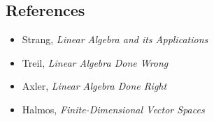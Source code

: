 \subsection*{References}
\begin{itemize}
    \item Strang, \emph{Linear Algebra and its Applications}
    \item Treil, \emph{Linear Algebra Done Wrong}
    \item Axler, \emph{Linear Algebra Done Right}
    \item Halmos, \emph{Finite-Dimensional Vector Spaces}
\end{itemize}
